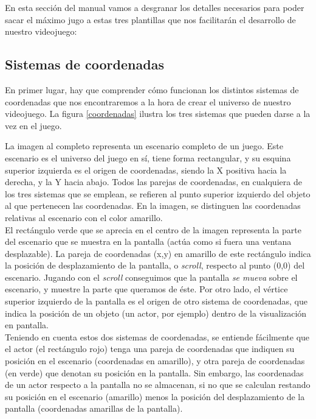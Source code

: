 En esta sección del manual vamos a desgranar los detalles necesarios para poder sacar el máximo jugo a estas tres plantillas que nos facilitarán el desarrollo de nuestro videojuego:

\subsection{Sistemas de coordenadas}

En primer lugar, hay que comprender cómo funcionan los distintos sistemas de coordenadas que nos encontraremos a la hora de crear el universo de nuestro videojuego. La figura \ref{coordenadas} ilustra los tres sistemas que pueden darse a la vez en el juego.\\


La imagen al completo representa un escenario completo de un juego. Este escenario es el universo del juego en sí, tiene forma rectangular, y su esquina superior izquierda es el origen de coordenadas, siendo la X positiva hacia la derecha, y la Y hacia abajo. Todos las parejas de coordenadas, en cualquiera de los tres sistemas que se emplean, se refieren al punto superior izquierdo del objeto al que pertenecen las coordenadas. En la imagen, se distinguen las coordenadas relativas al escenario con el color amarillo.\\

El rectángulo verde que se aprecia en el centro de la imagen representa la parte del escenario que se muestra en la pantalla (actúa como si fuera una ventana desplazable). La pareja de coordenadas (x,y) en amarillo de este rectángulo indica la posición de desplazamiento de la pantalla, o \emph{scroll}, respecto al punto (0,0) del escenario. Jugando con el \emph{scroll} conseguimos que la pantalla \emph{se mueva} sobre el escenario, y muestre la parte que queramos de éste. Por otro lado, el vértice superior izquierdo de la pantalla es el origen de otro sistema de coordenadas, que indica la posición de un objeto (un actor, por ejemplo) dentro de la visualización en pantalla.\\

Teniendo en cuenta estos dos sistemas de coordenadas, se entiende fácilmente que el actor (el rectángulo rojo) tenga una pareja de coordenadas que indiquen su posición en el escenario (coordenadas en amarillo), y otra pareja de coordenadas (en verde) que denotan su posición en la pantalla. Sin embargo, las coordenadas de un actor respecto a la pantalla no se almacenan, si no que se calculan restando su posición en el escenario (amarillo) menos la posición del desplazamiento de la pantalla (coordenadas amarillas de la pantalla).\\

